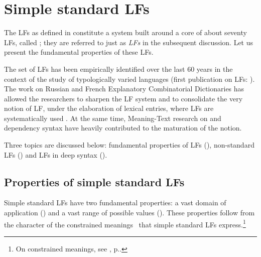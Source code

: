 \section{Simple standard LFs}\label{sec:characStandardLFs}

The LFs as defined in  constitute a system built around a core of about seventy LFs, called ; they are referred to just as \textit{LFs} in the subsequent discussion. Let us present the fundamental properties of these LFs.

The set of LFs has been empirically identified over the last 60 years in the context of the study of typologically varied languages (first publication on LFs: \cite{ZolkovskijMelcuk1965-e}). The work on Russian and French Explanatory Combinatorial Dictionaries has allowed the researchers to sharpen the LF system and to consolidate the very notion of LF, under the elaboration of lexical entries, where LFs are systematically used \parencite{MelcukZholkovsky1984,MelcukZolkovskij2016,MelcukEtAl1984,MelcukEtAl1988,MelcukEtAl1992,MelcukEtAl1999,MelcukPolguere2007-e}. At the same time, Meaning-Text research on  \parencites{Milicevic2007}[Ch.~9]{Melcuk2013c-e} and dependency syntax \parencite{MelcukPertsov1987,Melcuk1988a,Melcuk2009a,Melcuk2015c,Melcuk2016b,Melcuk2021a} have heavily contributed to the maturation of the notion.

Three topics are discussed below: fundamental properties of LFs (), non-standard LFs () and LFs in deep syntax ().

\subsection{Properties of simple standard LFs}\label{sec:FLStandard2Carac}

Simple standard LFs have two fundamental properties: a vast domain of application () and a vast range of possible values (). These properties follow from the character of the constrained meanings \sigmaF\ that simple standard LFs express.\footnote{On constrained meanings, see , p.\thinspace\pageref{txt:constrainedMeaning}.}

